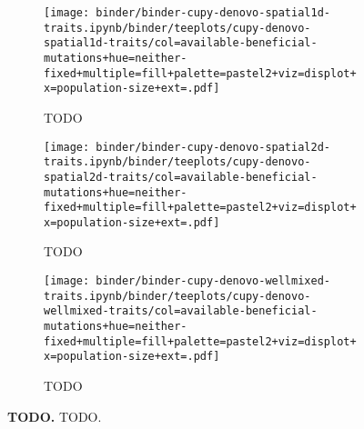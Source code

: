 \begin{sidewaysfigure}[h]
  \rotatesidewayslabel
    \begin{subfigure}[b]{0.32\linewidth}
        \begin{minipage}{\linewidth}
          \texttt{[image: binder/binder-cupy-denovo-spatial1d-traits.ipynb/binder/teeplots/cupy-denovo-spatial1d-traits/col=available-beneficial-mutations+hue=neither-fixed+multiple=fill+palette=pastel2+viz=displot+x=population-size+ext=.pdf]}%
        \end{minipage}
        \begin{minipage}{\linewidth}
        \caption{TODO}
        \label{fig:neither-fixed-denovo-cupy:spatial1d}
        \end{minipage}%
    \end{subfigure}%
    \begin{subfigure}[b]{0.32\linewidth}
        \begin{minipage}{\linewidth}
          \texttt{[image: binder/binder-cupy-denovo-spatial2d-traits.ipynb/binder/teeplots/cupy-denovo-spatial2d-traits/col=available-beneficial-mutations+hue=neither-fixed+multiple=fill+palette=pastel2+viz=displot+x=population-size+ext=.pdf]}%
        \end{minipage}
        \begin{minipage}{\linewidth}
        \caption{TODO}
        \label{fig:neither-fixed-denovo-cupy:spatial2d}
        \end{minipage}%
    \end{subfigure}%
\begin{subfigure}[b]{0.36\linewidth}
    \begin{minipage}{\linewidth}
      \texttt{[image: binder/binder-cupy-denovo-wellmixed-traits.ipynb/binder/teeplots/cupy-denovo-wellmixed-traits/col=available-beneficial-mutations+hue=neither-fixed+multiple=fill+palette=pastel2+viz=displot+x=population-size+ext=.pdf]}%
    \end{minipage}
    \begin{minipage}{\linewidth}
    \caption{TODO}
    \label{fig:neither-fixed-denovo-cupy:wellmixed}
    \end{minipage}%
\end{subfigure}%


  \begin{minipage}{\linewidth}
    \caption{%
      \textbf{TODO.}
      \footnotesize
     TODO.
    }
    \label{fig:neither-fixed-denovo-cupy}
  \end{minipage}
\end{sidewaysfigure}
